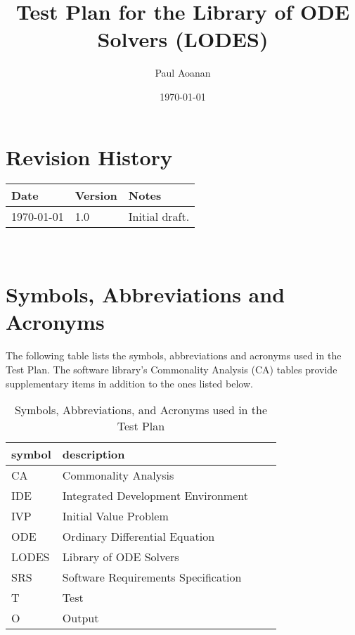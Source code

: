 \documentclass[12pt, titlepage]{article}
\newcommand{\famname}{LODES} %
\newcommand{\famdesc}{Library of ODE Solvers}
\begin{document}
\title{Test Plan for the Library of ODE Solvers (LODES)} 
\author{Paul Aoanan}
\date{\today}
	
\maketitle


\section{Revision History}
\begin{tabularx}{\textwidth}{p{3cm}p{2cm}X}
\toprule {\bf Date} & {\bf Version} & {\bf Notes}\\
\midrule
\today & 1.0 & Initial draft.\\
\bottomrule
\end{tabularx}

~\newpage

\section{Symbols, Abbreviations and Acronyms}
The following table lists the symbols, abbreviations and acronyms used in the Test Plan.
The software library's Commonality Analysis (CA) tables provide supplementary items in addition to the ones 
listed below.\\
\begin{table} [h]
\renewcommand{\arraystretch}{1.2}
\begin{tabular}{l l l l |} 
  \toprule		
  \textbf{symbol} & \textbf{description}\\
  \midrule 
  CA & Commonality Analysis\\
  IDE & Integrated Development Environment\\ 
  IVP & Initial Value Problem\\
  ODE & Ordinary Differential Equation\\
  \famname{} & \famdesc{}\\
  SRS & Software Requirements Specification\\
  T & Test\\
  O & Output\\
  \bottomrule
\end{tabular}\\
  \caption{Symbols, Abbreviations, and Acronyms used in the Test Plan}
  \label{Table:Table_Symbols}
\end{table}
\end{document}
